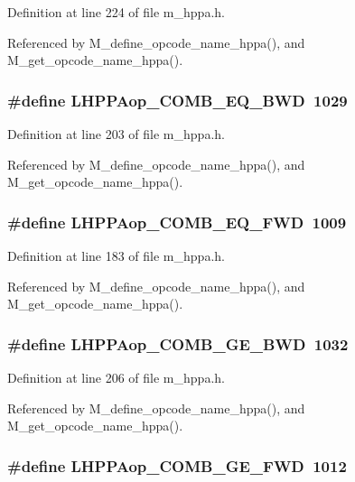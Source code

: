 Definition at line 224 of file m\_\-hppa.h.

Referenced by M\_\-define\_\-opcode\_\-name\_\-hppa(), and M\_\-get\_\-opcode\_\-name\_\-hppa().
\subsubsection{\setlength{\rightskip}{0pt plus 5cm}\#define LHPPAop\_\-COMB\_\-EQ\_\-BWD~1029}\label{m__hppa_8h_04eadd7e0f3be31b07a4faefb074c2a2}




Definition at line 203 of file m\_\-hppa.h.

Referenced by M\_\-define\_\-opcode\_\-name\_\-hppa(), and M\_\-get\_\-opcode\_\-name\_\-hppa().
\subsubsection{\setlength{\rightskip}{0pt plus 5cm}\#define LHPPAop\_\-COMB\_\-EQ\_\-FWD~1009}\label{m__hppa_8h_ab553252d09f0da39c7de0ddc1bf8a6f}




Definition at line 183 of file m\_\-hppa.h.

Referenced by M\_\-define\_\-opcode\_\-name\_\-hppa(), and M\_\-get\_\-opcode\_\-name\_\-hppa().
\subsubsection{\setlength{\rightskip}{0pt plus 5cm}\#define LHPPAop\_\-COMB\_\-GE\_\-BWD~1032}\label{m__hppa_8h_3430bb60bced258fa2361c619b27609b}




Definition at line 206 of file m\_\-hppa.h.

Referenced by M\_\-define\_\-opcode\_\-name\_\-hppa(), and M\_\-get\_\-opcode\_\-name\_\-hppa().
\subsubsection{\setlength{\rightskip}{0pt plus 5cm}\#define LHPPAop\_\-COMB\_\-GE\_\-FWD~1012}\label{m__hppa_8h_4775051886f52c47166fafd3afde51c2}




